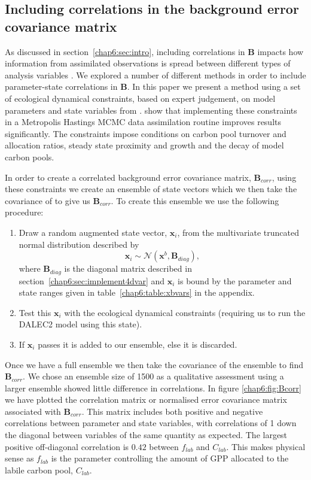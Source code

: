 \subsection{Including correlations in the background error covariance matrix} \label{chap6:sec:corB}

As discussed in section~\ref{chap6:sec:intro}, including correlations in \textbf{B} impacts how information from assimilated observations is spread between different types of analysis variables \citep{bannister2008review}. We explored a number of different methods in order to include parameter-state correlations in \textbf{B}. In this paper we present a method using a set of ecological dynamical constraints, based on expert judgement, on model parameters and state variables from \citet{Bloom2015}. \citet{Bloom2015} show that implementing these constraints in a Metropolis Hastings MCMC data assimilation routine improves results significantly. The constraints impose conditions on carbon pool turnover and allocation ratios, steady state proximity and growth and the decay of model carbon pools.

In order to create a correlated background error covariance matrix, $\textbf{B}_{corr}$, using these constraints we create an ensemble of state vectors which we then take the covariance of to give us $\textbf{B}_{corr}$. To create this ensemble we use the following procedure:
\begin{enumerate}
\item Draw a random augmented state vector, $\textbf{x}_i$, from the multivariate truncated normal distribution described by
\begin{equation}
\textbf{x}_i \sim \mathcal{N}(\textbf{x}^b, \textbf{B}_{diag}),
\end{equation} 
where $\textbf{B}_{diag}$ is the diagonal matrix described in section~\ref{chap6:sec:implement4dvar} and $\textbf{x}_i$ is bound by the parameter and state ranges given in table~\ref{chap6:table:xbvars} in the appendix.
\item Test this $\textbf{x}_i$ with the ecological dynamical constraints (requiring us to run the DALEC2 model using this state).
\item If $\textbf{x}_i$ passes it is added to our ensemble, else it is discarded.
\end{enumerate}
Once we have a full ensemble we then take the covariance of the ensemble to find $\textbf{B}_{corr}$. We chose an ensemble size of 1500 as a qualitative assessment using a larger ensemble showed little difference in correlations. In figure \ref{chap6:fig:Bcorr} we have plotted the correlation matrix or normalised error covariance matrix associated with $\textbf{B}_{corr}$. This matrix includes both positive and negative correlations between parameter and state variables, with correlations of 1 down the diagonal between variables of the same quantity as expected. The largest positive off-diagonal correlation is $0.42$ between $f_{lab}$ and $C_{lab}$. This makes physical sense as $f_{lab}$ is the parameter controlling the amount of GPP allocated to the labile carbon pool, $C_{lab}$.

